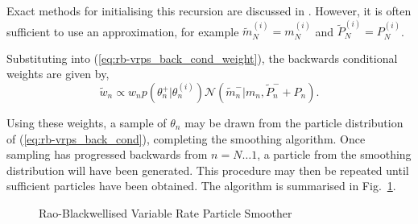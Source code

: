 \documentclass[journal]{IEEEtran}
\begin{document}
Exact methods for initialising this recursion are discussed in \cite{Kitagawa1994}. However, it is often sufficient to use an approximation, for example $\tilde{m}_N^{(i)} = m_N^{(i)}$ and $\tilde{P}_N^{(i)} = P_N^{(i)}$.

Substituting into (\ref{eq:rb-vrps_back_cond_weight}), the backwards conditional weights are given by,
%
\begin{equation}
 \tilde{w}_n \propto w_n p(\theta_{n}^+|\theta_{n}^{(i)}) \mathcal{N}(\tilde{m}_n^-|m_n, \tilde{P}_n^- + P_n)     .
\label{eq:rb-vrps_back_cond_weight2}
\end{equation}

Using these weights, a sample of $\theta_{n}$ may be drawn from the particle distribution of (\ref{eq:rb-vrps_back_cond}), completing the smoothing algorithm. Once sampling has progressed backwards from $n=N \dots 1$, a particle from the smoothing distribution will have been generated. This procedure may then be repeated until sufficient particles have been obtained. The algorithm is summarised in Fig.~\ref{alg:RBVRPS}.

\begin{figure}
\caption{Rao-Blackwellised Variable Rate Particle Smoother}
\label{alg:RBVRPS}
\end{figure}
\end{document}
